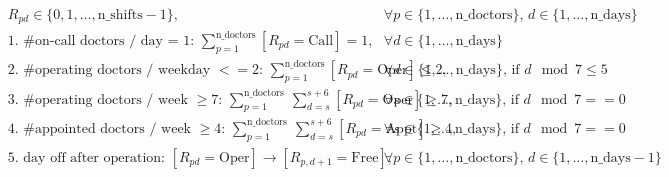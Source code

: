 \documentclass{cons-beamer}
\begin{document}
\begin{frame}
  \begin{example}
    \scriptsize
    \vspace{-1em}
    \begin{align}
      &R_{pd} \in \{0, 1, \dots, {\text{n\_shifts}}-1\}, \quad &&\forall p \in \{1, \dots, {\text{n\_doctors}}\}, \, d \in \{1, \dots, {\text{n\_days}}\} \\
      &\text{1. \#on-call doctors / day = 1: } 
      \sum_{p=1}^{{\text{n\_doctors}}} [R_{pd} = \text{Call}] = 1, \quad &&\forall d \in \{1, \dots, {\text{n\_days}}\} \\
      &\text{2. \#operating doctors / weekday $<= 2$: } 
      \sum_{p=1}^{{\text{n\_doctors}}} [R_{pd} = \text{Oper}] \leq 2, \quad &&\forall d \in \{1, \dots, {\text{n\_days}}\}, \, \text{if } d\mod 7 \leq 5 \\
      &\text{3. \#operating doctors / week $\geq 7$: } 
      \sum_{p=1}^{{\text{n\_doctors}}}~\sum_{d=s}^{s+6} [R_{pd} = \text{Oper}] \geq 7, \quad &&\forall s \in \{1, \dots, {\text{n\_days}}\}, \, \text{if } d\mod 7 == 0 \\
      &\text{4. \#appointed doctors / week $\geq 4$: }
      \sum_{p=1}^{{\text{n\_doctors}}}~\sum_{d=s}^{s+6} [R_{pd} = \text{Appt}] \geq 4, \quad &&\forall s \in \{1, \dots, {\text{n\_days}}\}, \, \text{if } d\mod 7 == 0 \\
      &\text{5. day off after operation: } 
      [R_{pd} = \text{Oper}] \rightarrow [R_{p,d+1} = \text{Free}], \quad &&\forall p \in \{1, \dots, {\text{n\_doctors}}\}, \, d \in \{1, \dots, {\text{n\_days}}-1\} 
    \end{align}
  \end{example}
\end{frame}
\end{document}
